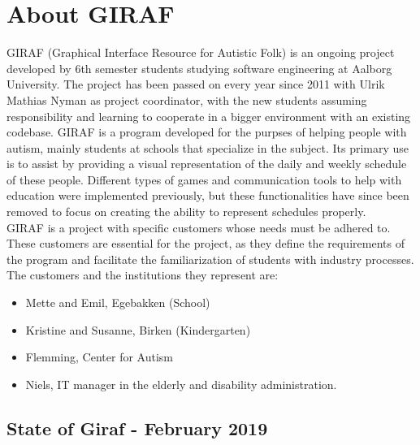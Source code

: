 \section{About GIRAF}
GIRAF (Graphical Interface Resource for Autistic Folk) is an ongoing project developed by 6th semester students studying software engineering at Aalborg University. 
The project has been passed on every year since 2011 with Ulrik Mathias Nyman as project coordinator, with the new students assuming responsibility and learning to cooperate in a bigger environment with an existing codebase. 
GIRAF is a program developed for the purpses of helping people with autism, mainly students at schools that specialize in the subject.
Its primary use is to assist by providing a visual representation of the daily and weekly schedule of these people.
Different types of games and communication tools to help with education were implemented previously, but these functionalities have since been removed to focus on creating the ability to represent schedules properly.
\\
GIRAF is a project with specific customers whose needs must be adhered to. 
These customers are essential for the project, as they define the requirements of the program and facilitate the familiarization of students with industry processes.
The customers and the institutions they represent are: 
\begin{itemize}
    \item Mette and Emil, Egebakken (School)
    \item Kristine and Susanne, Birken (Kindergarten)
    \item Flemming, Center for Autism
    \item Niels, IT manager in the elderly and disability administration.
\end{itemize}

\subsection{State of Giraf - February 2019}

